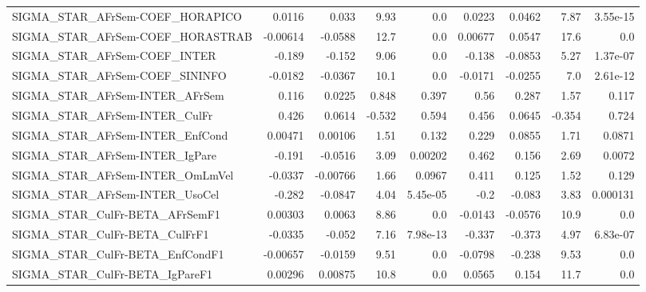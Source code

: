 \begin{tabular}{lrrrrrrrr}
SIGMA\_STAR\_AFrSem-COEF\_HORAPICO       &      0.0116 &        0.033 &    9.93 &      0.0 &     0.0223 &      0.0462 &         7.87 &      3.55e-15 \\
SIGMA\_STAR\_AFrSem-COEF\_HORASTRAB      &    -0.00614 &      -0.0588 &    12.7 &      0.0 &    0.00677 &      0.0547 &         17.6 &           0.0 \\
SIGMA\_STAR\_AFrSem-COEF\_INTER          &      -0.189 &       -0.152 &    9.06 &      0.0 &     -0.138 &     -0.0853 &         5.27 &      1.37e-07 \\
SIGMA\_STAR\_AFrSem-COEF\_SININFO        &     -0.0182 &      -0.0367 &    10.1 &      0.0 &    -0.0171 &     -0.0255 &          7.0 &      2.61e-12 \\
SIGMA\_STAR\_AFrSem-INTER\_AFrSem        &       0.116 &       0.0225 &   0.848 &    0.397 &       0.56 &       0.287 &         1.57 &         0.117 \\
SIGMA\_STAR\_AFrSem-INTER\_CulFr         &       0.426 &       0.0614 &  -0.532 &    0.594 &      0.456 &      0.0645 &       -0.354 &         0.724 \\
SIGMA\_STAR\_AFrSem-INTER\_EnfCond       &     0.00471 &      0.00106 &    1.51 &    0.132 &      0.229 &      0.0855 &         1.71 &        0.0871 \\
SIGMA\_STAR\_AFrSem-INTER\_IgPare        &      -0.191 &      -0.0516 &    3.09 &  0.00202 &      0.462 &       0.156 &         2.69 &        0.0072 \\
SIGMA\_STAR\_AFrSem-INTER\_OmLmVel       &     -0.0337 &     -0.00766 &    1.66 &   0.0967 &      0.411 &       0.125 &         1.52 &         0.129 \\
SIGMA\_STAR\_AFrSem-INTER\_UsoCel        &      -0.282 &      -0.0847 &    4.04 & 5.45e-05 &       -0.2 &      -0.083 &         3.83 &      0.000131 \\
SIGMA\_STAR\_CulFr-BETA\_AFrSemF1        &     0.00303 &       0.0063 &    8.86 &      0.0 &    -0.0143 &     -0.0576 &         10.9 &           0.0 \\
SIGMA\_STAR\_CulFr-BETA\_CulFrF1         &     -0.0335 &       -0.052 &    7.16 & 7.98e-13 &     -0.337 &      -0.373 &         4.97 &      6.83e-07 \\
SIGMA\_STAR\_CulFr-BETA\_EnfCondF1       &    -0.00657 &      -0.0159 &    9.51 &      0.0 &    -0.0798 &      -0.238 &         9.53 &           0.0 \\
SIGMA\_STAR\_CulFr-BETA\_IgPareF1        &     0.00296 &      0.00875 &    10.8 &      0.0 &     0.0565 &       0.154 &         11.7 &           0.0 \\

\end{tabular}
